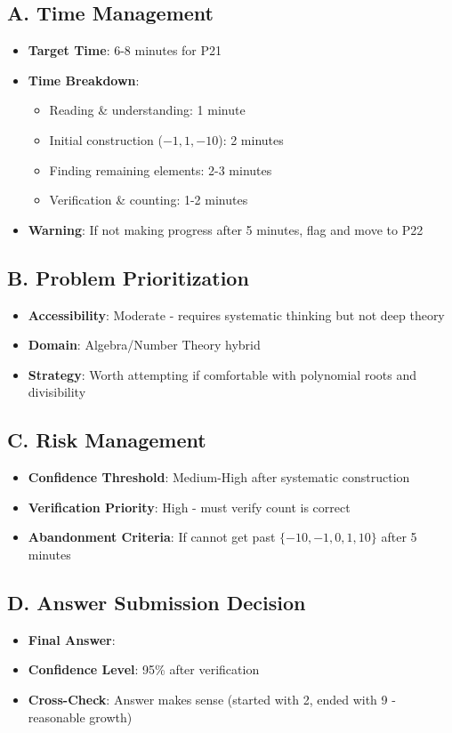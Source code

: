 \documentclass[12pt]{article}
\begin{document}
\begin{competitionbox}
\subsection*{A. Time Management}
\begin{itemize}
    \item \textbf{Target Time}: 6-8 minutes for P21
    \item \textbf{Time Breakdown}:
    \begin{itemize}
        \item Reading \& understanding: 1 minute
        \item Initial construction ($-1, 1, -10$): 2 minutes
        \item Finding remaining elements: 2-3 minutes
        \item Verification \& counting: 1-2 minutes
    \end{itemize}
    \item \textbf{Warning}: If not making progress after 5 minutes, flag and move to P22
\end{itemize}

\subsection*{B. Problem Prioritization}
\begin{itemize}
    \item \textbf{Accessibility}: Moderate - requires systematic thinking but not deep theory
    \item \textbf{Domain}: Algebra/Number Theory hybrid
    \item \textbf{Strategy}: Worth attempting if comfortable with polynomial roots and divisibility
\end{itemize}

\subsection*{C. Risk Management}
\begin{itemize}
    \item \textbf{Confidence Threshold}: Medium-High after systematic construction
    \item \textbf{Verification Priority}: High - must verify count is correct
    \item \textbf{Abandonment Criteria}: If cannot get past $\{-10, -1, 0, 1, 10\}$ after 5 minutes
\end{itemize}

\subsection*{D. Answer Submission Decision}
\begin{itemize}
    \item \textbf{Final Answer}: 
    \item \textbf{Confidence Level}: 95\% after verification
    \item \textbf{Cross-Check}: Answer makes sense (started with 2, ended with 9 - reasonable growth)
\end{itemize}
\end{competitionbox}
\end{document}
